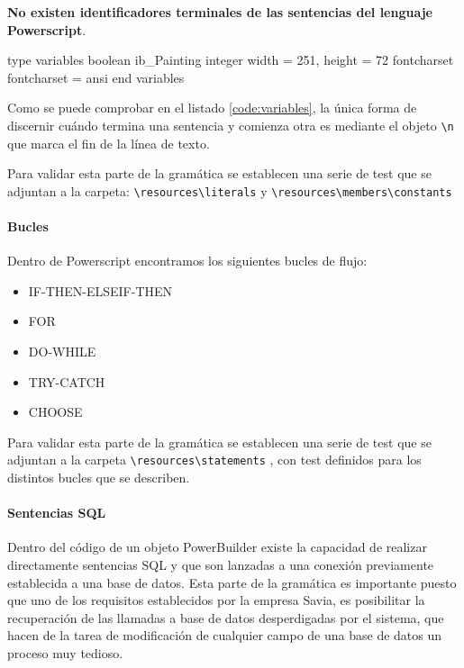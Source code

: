\textbf{No existen identificadores terminales de las sentencias del lenguaje Powerscript}.

\begin{listing}[
  float=ht,
  language = Powerscript,
  caption  = {Definición de variables},
  label    = code:variables]
type variables
boolean ib_Painting
integer width = 251, height = 72
fontcharset fontcharset = ansi
end variables
\end{listing}

Como se puede comprobar en el listado \ref{code:variables}, la única forma de discernir cuándo termina una sentencia y comienza otra es mediante el objeto 
\verb|\n| que marca el fin de la línea de texto. 

Para validar esta parte de la gramática se establecen una serie de test que se adjuntan a la carpeta: \verb|\resources\literals| y \verb|\resources\members\constants|

\paragraph{Bucles}

Dentro de Powerscript encontramos los siguientes bucles de flujo:
\begin{itemize}
 \item IF-THEN-ELSEIF-THEN 
 \item FOR 
 \item DO-WHILE
 \item TRY-CATCH
 \item CHOOSE
\end{itemize}
Para validar esta parte de la gramática se establecen una serie de test que se adjuntan a la carpeta \verb|\resources\statements| , con test definidos para los distintos bucles
que se describen.

\paragraph{Sentencias SQL}
Dentro del código de un objeto PowerBuilder existe la capacidad de realizar directamente sentencias SQL y que son lanzadas a una conexión previamente establecida a una base de datos.
Esta parte de la gramática es importante puesto que uno de los requisitos establecidos por la empresa Savia, es posibilitar la recuperación de las llamadas a base de datos desperdigadas
por el sistema, que hacen de la tarea de modificación de cualquier campo de una base de datos un proceso muy tedioso.

